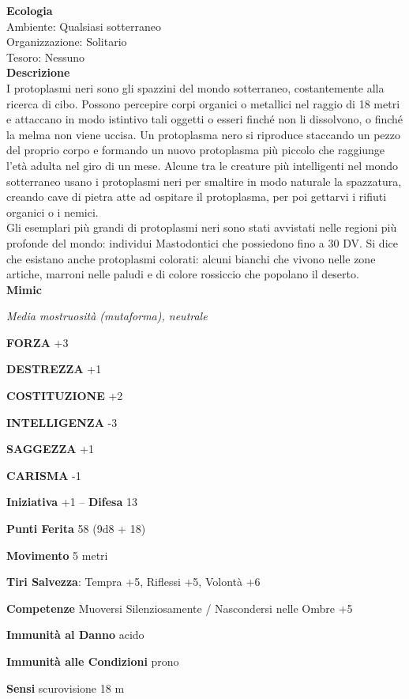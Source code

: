 \begin{multicols}{2}
\textbf{Ecologia}\\
Ambiente: Qualsiasi sotterraneo\\
Organizzazione: Solitario\\
Tesoro: Nessuno\\
\textbf{Descrizione}\\
I protoplasmi neri sono gli spazzini del mondo sotterraneo, costantemente alla ricerca di cibo. Possono percepire corpi organici o metallici nel raggio di 18 metri e attaccano in modo istintivo tali oggetti o esseri finché non li dissolvono, o finché la melma non viene uccisa. Un protoplasma nero si riproduce staccando un pezzo del proprio corpo e formando un nuovo protoplasma più piccolo che raggiunge l'età adulta nel giro di un mese. Alcune tra le creature più intelligenti nel mondo sotterraneo usano i protoplasmi neri per smaltire in modo naturale la spazzatura, creando cave di pietra atte ad ospitare il protoplasma, per poi gettarvi i rifiuti organici o i nemici.\\
Gli esemplari più grandi di protoplasmi neri sono stati avvistati nelle regioni più profonde del mondo: individui Mastodontici che possiedono fino a 30 DV. Si dice che esistano anche protoplasmi colorati: alcuni bianchi che vivono nelle zone artiche, marroni nelle paludi e di colore rossiccio che popolano il deserto.\\


\medskip{}\textbf{Mimic}

\emph{Media mostruosità (mutaforma), neutrale}

\textbf{FORZA} +3

\textbf{DESTREZZA} +1

\textbf{COSTITUZIONE} +2

\textbf{INTELLIGENZA} -3

\textbf{SAGGEZZA} +1

\textbf{CARISMA} -1

\textbf{Iniziativa} +1 -- \textbf{Difesa} 13

\textbf{Punti Ferita} 58 (9d8 + 18)

\textbf{Movimento} 5 metri

\textbf{Tiri Salvezza}: Tempra +5, Riflessi +5, Volontà +6

\textbf{Competenze} Muoversi Silenziosamente / Nascondersi nelle Ombre +5

\textbf{Immunità al Danno} acido

\textbf{Immunità alle Condizioni} prono

\textbf{Sensi} scurovisione 18 m


\end{multicols}
